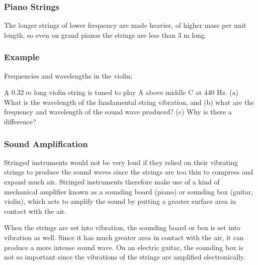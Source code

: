 \documentclass[]{beamer}
\begin{document}



\begin{frame}
\frametitle{Piano Strings}


The longer strings of lower frequency are made heavier, of higher mass
per unit length, so even on grand pianos the strings are less than 3 m long.

  \end{frame}





\begin{frame}
\frametitle{Example}

Frequencies and wavelengths in the violin:
\vspace{3mm}


A $0.32~m$ long violin string is tuned to play A above middle C at 440 Hz. (a) What is the
wavelength of the fundamental string vibration, and (b) what are the frequency
and wavelength of the sound wave produced? (c) Why is there a difference?

  \end{frame}





\begin{frame}
\frametitle{Sound Amplification}

Stringed instruments would not be very loud if they relied on their vibrating
strings to produce the sound waves since the strings are too thin to compress and
expand much air. Stringed instruments therefore make use of a kind of mechanical
amplifier known as a sounding board (piano) or sounding box (guitar, violin), which
acts to amplify the sound by putting a greater surface area in contact with the air.
\vspace{3mm}

When the strings are set into vibration, the sounding board or box is set
into vibration as well. Since it has much greater area in contact with the air, it can
produce a more intense sound wave. On an electric guitar, the sounding box is not
so important since the vibrations of the strings are amplified electronically.

  \end{frame}


\end{document}
